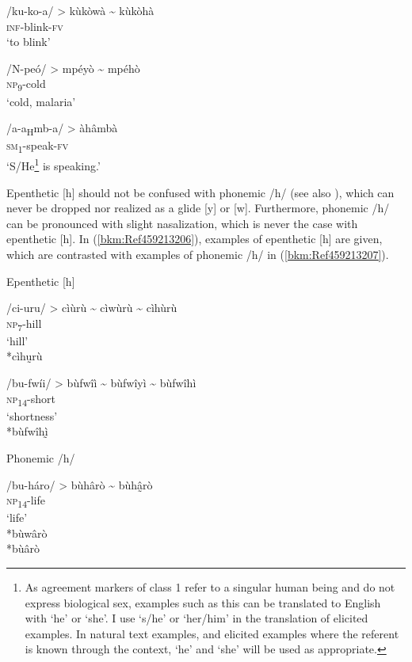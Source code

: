 \ea
\label{bkm:Ref98928623}
/ku-ko-a/ > kùkòwà {\textasciitilde} kùkòhà\\
\textsc{inf}-blink-\textsc{fv}\\
\glt ‘to blink’
\z

\ea
\label{bkm:Ref98928625}
/N-peó/ > mpéyò {\textasciitilde} mpéhò\\
\textsc{np}\textsubscript{9}-cold\\
\glt ‘cold, malaria’
\z

\ea
\label{bkm:Ref506810235}
/a-a\textsubscript{H}mb-a/ > àhâmbà\\
\textsc{sm}\textsubscript{1}-speak-\textsc{fv}\\
\glt ‘S/He\footnote{As agreement markers of class 1 refer to a singular human being and do not express biological sex, examples such as this can be translated to English with ‘he’ or ‘she’. I use ‘s/he’ or ‘her/him’ in the translation of elicited examples. In natural text examples, and elicited examples where the referent is known through the context, ‘he’ and ‘she’ will be used as appropriate.}  is speaking.’
\z

Epenthetic [h] should not be confused with phonemic /h/ (see also ), which can never be dropped nor realized as a glide [y] or [w]. Fur\-thermore, phonemic /h/ can be pronounced with slight nasalization, which is never the case with epenthetic [h]. In (\ref{bkm:Ref459213206}), examples of epenthetic [h] are given, which are contrasted with examples of phonemic /h/ in (\ref{bkm:Ref459213207}).

\ea
\label{bkm:Ref459213206}
 Epenthetic [h]

\ea
/ci-uru/ > cìùrù {\textasciitilde} cìwùrù {\textasciitilde} cìhùrù\\
\textsc{np}\textsubscript{7}-hill\\
\glt ‘hill’\\
*cìhṵrù

\ex
/bu-fwíi/ > bùfwîì {\textasciitilde} bùfwîyì {\textasciitilde} bùfwîhì\\
\textsc{np}\textsubscript{14}-short\\
\glt ‘shortness’\\
*bùfwîhḭ̀
\z\z

\ea
\label{bkm:Ref459213207}
  Phonemic /h/

\ea
/bu-háro/ > bùhârò {\textasciitilde} bùhâ̰rò\\
\textsc{np}\textsubscript{14}-life\\
\glt ‘life’\\
*bùwârò \\
*bùârò


